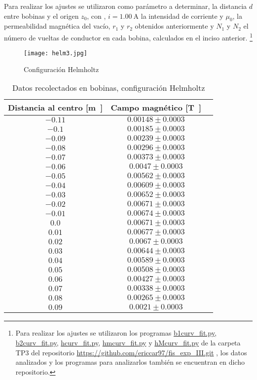 \documentclass[12pt,a4paper]{article}
\begin{document}
Para realizar los ajustes se utilizaron como parámetro a determinar, la distancia $d$ entre bobinas y el origen $z_0$, con , $i = \SI{1.00}{\ampere}$ la intensidad de corriente y $\mu_0$, la permeabilidad magnética del vacío, $r_1$ y $r_2$ obtenidos anteriormente y $N_1$ y $N_2$ el número de vueltas de conductor en cada bobina, calculados en el inciso anterior. \footnote{Para realizar los ajustes se utilizaron los programas \url{b1curv_fit.py}, \url{b2curv_fit.py}, \url{hcurv_fit.py}, \url{hmcurv_fit.py} y  \url{hMcurv_fit.py} de la carpeta TP3 del repositorio \url{https://github.com/ericcar97/fis_exp_III.git} , los datos analizados y los programas para analizarlos también se encuentran en dicho repositorio.}



\begin{figure}[H]
  \centering
   \texttt{[image: helm3.jpg]}
\caption{Configuración Helmholtz}
  \label{fig:ejemplo}
\end{figure}



\begin{table}[H]
 \centering
 \begin{tabular}{|c|c|c}
Distancia al centro [\si\meter] & Campo magnético [\si\tesla] \\
\hline
$ -0.11 $ & $ 0.00148 \pm 0.0003 $ \\
$ -0.1 $ & $ 0.00185 \pm 0.0003 $ \\ 
$ -0.09 $ & $ 0.00239 \pm 0.0003 $ \\ 
$ -0.08 $ & $ 0.00296 \pm 0.0003 $ \\ 
$ -0.07 $ & $ 0.00373 \pm 0.0003 $ \\ 
$ -0.06 $ & $ 0.0047 \pm 0.0003 $ \\ 
$ -0.05 $ & $ 0.00562 \pm 0.0003 $ \\ 
$ -0.04 $ & $ 0.00609 \pm 0.0003 $ \\ 
$ -0.03 $ & $ 0.00652 \pm 0.0003 $ \\ 
$ -0.02 $ & $ 0.00671 \pm 0.0003 $ \\ 
$ -0.01 $ & $ 0.00674 \pm 0.0003 $ \\ 
$ 0.0 $ & $ 0.00671 \pm 0.0003 $ \\ 
$ 0.01 $ & $ 0.00677 \pm 0.0003 $ \\ 
$ 0.02 $ & $ 0.0067 \pm 0.0003 $ \\ 
$ 0.03 $ & $ 0.00644 \pm 0.0003 $ \\ 
$ 0.04 $ & $ 0.00589 \pm 0.0003 $ \\
$ 0.05 $ & $ 0.00508 \pm 0.0003 $ \\ 
$ 0.06 $ & $ 0.00427 \pm 0.0003 $ \\ 
$ 0.07 $ & $ 0.00338 \pm 0.0003 $ \\ 
$ 0.08 $ & $ 0.00265 \pm 0.0003 $ \\ 
$ 0.09 $ & $ 0.0021 \pm 0.0003 $ \\

 \end{tabular}
\caption{Datos recolectados en bobinas, configuración Helmholtz} 
 \end{table}
\end{document}
